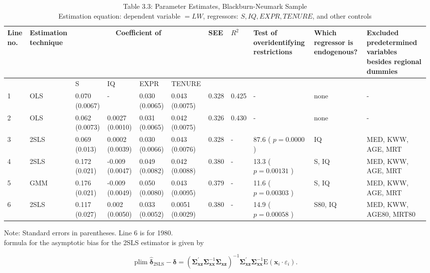\documentclass[10pt]{article}
\begin{document}
\begin{table}[h]
\begin{center}
\captionsetup{labelformat=empty}
\caption{Table 3.3: Parameter Estimates, Blackburn-Neumark Sample\\
Estimation equation: dependent variable $=L W$, regressors: $S, I Q, E X P R, T E N U R E$, and other controls}
\begin{tabular}{|l|l|l|l|l|l|l|l|l|l|l|}
\hline
\multirow{2}{*}{Line no.} & \multirow{2}{*}{Estimation technique} & \multicolumn{4}{|c|}{Coefficient of} & \multirow{2}{*}{SEE} & \multirow{2}{*}{$R^{2}$} & \multirow{2}{*}{Test of overidentifying restrictions} & \multirow{2}{*}{Which regressor is endogenous?} & \multirow{2}{*}{Excluded predetermined variables besides regional dummies} \\
\hline
 &  & S & IQ & EXPR & TENURE &  &  &  &  &  \\
\hline
1 & OLS & 0.070 (0.0067) & - & 0.030 (0.0065) & 0.043 (0.0075) & 0.328 & 0.425 & - & none & - \\
\hline
2 & OLS & 0.062 (0.0073) & 0.0027 (0.0010) & 0.031 (0.0065) & 0.042 (0.0075) & 0.326 & 0.430 & - & none & - \\
\hline
3 & 2SLS & 0.069 (0.013) & 0.0002 (0.0039) & 0.030 (0.0066) & 0.043 (0.0076) & 0.328 & - & 87.6 ( $p=0.0000$ ) & IQ & MED, KWW, AGE, MRT \\
\hline
4 & 2SLS & 0.172 (0.021) & -0.009 (0.0047) & 0.049 (0.0082) & 0.042 (0.0088) & 0.380 & - & 13.3 ( $p=0.00131$ ) & S, IQ & MED, KWW, AGE, MRT \\
\hline
5 & GMM & 0.176 (0.021) & -0.009 (0.0049) & 0.050 (0.0080) & 0.043 (0.0095) & 0.379 & - & 11.6 ( $p=0.00303$ ) & S, IQ & MED, KWW, AGE, MRT \\
\hline
6 & 2SLS & 0.117 (0.027) & 0.002 (0.0050) & 0.033 (0.0052) & 0.0051 (0.0029) & 0.380 & - & 14.9 ( $p=0.00058$ ) & S80, IQ & MED, KWW, AGE80, MRT80 \\
\hline
\end{tabular}
\end{center}
\end{table}

Note: Standard errors in parentheses. Line 6 is for 1980.\\
formula for the asymptotic bias for the 2SLS estimator is given by

$$
\operatorname{plim} \hat{\boldsymbol{\delta}}_{2 \mathrm{SLS}}-\boldsymbol{\delta}=\left(\boldsymbol{\Sigma}_{\mathbf{x z}}^{\prime} \boldsymbol{\Sigma}_{\mathbf{x x}}^{-1} \boldsymbol{\Sigma}_{\mathbf{x z}}\right)^{-1} \boldsymbol{\Sigma}_{\mathbf{x z}}^{\prime} \boldsymbol{\Sigma}_{\mathbf{x x}}^{-1} \mathrm{E}\left(\mathbf{x}_{i} \cdot \varepsilon_{i}\right) .
$$
\end{document}
